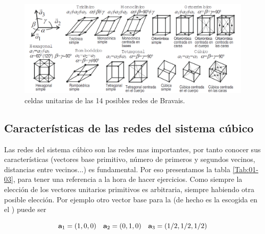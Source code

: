 \begin{figure}[h!] \centering
    \includegraphics[scale=0.73]{Cuerpo/Ch_01/Redes_bravais.png}
    \caption{celdas unitarias de las 14 posibles redes de Bravais.}
    \label{Fig:01-03}
\end{figure}

\subsection{Características de las redes del sistema cúbico}

Las redes del sistema cúbico son las redes mas importantes, por tanto conocer sus características (vectores base primitivo, número de primeros y segundos vecinos, distancias entre vecinos...) es fundamental. Por eso presentamos la tabla \ref{Tab:01-03}, para tener una referencia a la hora de hacer ejercicios. Como siempre la elección de los vectores unitarios primitivos es arbitraria, siempre habiendo otra posible elección. Por ejemplo otro vector base para la \bcc (de hecho es la escogida en el \cite{Oxford_Solid_State}) puede ser

\begin{equation}
	\mathbf{a}_1 = (1,0,0) \quad \mathbf{a}_2 = (0,1,0) \quad \mathbf{a}_3 = (1/2,1/2,1/2) 
\end{equation}

